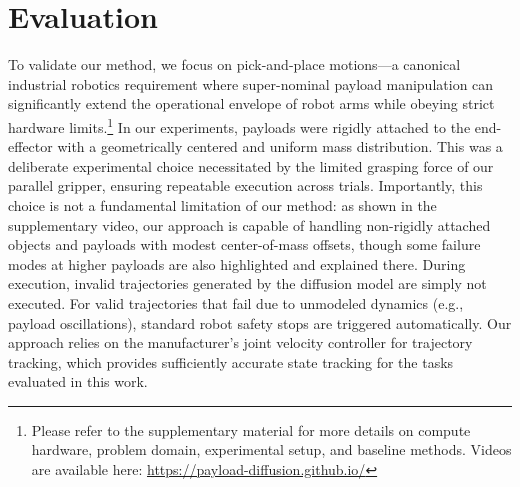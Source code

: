 \vspace{-0.12in}
\section{Evaluation}
\vspace{-0.05in}
To validate our method, we focus on pick-and-place motions---a canonical industrial robotics requirement where super-nominal payload manipulation can significantly extend the operational envelope of robot arms while obeying strict hardware limits.\footnote{Please refer to the supplementary material for more details on compute hardware, problem domain, experimental setup, and baseline methods. Videos are available here: \url{https://payload-diffusion.github.io/}}
In our experiments, payloads were rigidly attached to the end-effector with a geometrically centered and uniform mass distribution. This was a deliberate experimental choice necessitated by the limited grasping force of our parallel gripper, ensuring repeatable execution across trials. Importantly, this choice is not a fundamental limitation of our method: as shown in the supplementary video, our approach is capable of handling non-rigidly attached objects and payloads with modest center-of-mass offsets, though some failure modes at higher payloads are also highlighted and explained there.
During execution, invalid trajectories generated by the diffusion model are simply not executed. For valid trajectories that fail due to unmodeled dynamics (e.g., payload oscillations), standard robot safety stops are triggered automatically. Our approach relies on the manufacturer's joint velocity controller for trajectory tracking, which provides sufficiently accurate state tracking for the tasks evaluated in this work.



